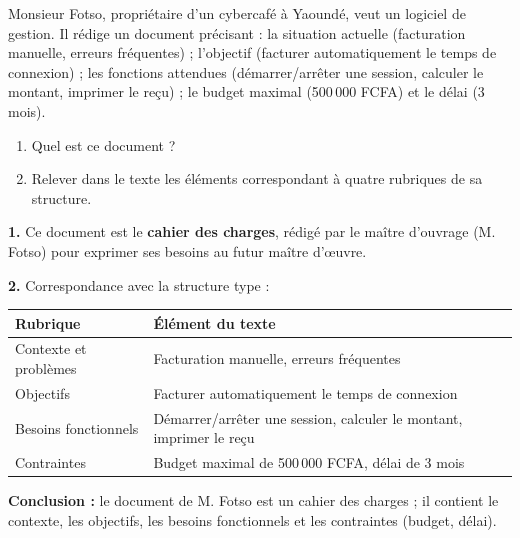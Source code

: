 \documentclass[11pt]{article}
\begin{document}
\begin{exoresolu}
Monsieur Fotso, propriétaire d'un cybercafé à Yaoundé, veut un logiciel de gestion. Il rédige un document précisant : la situation actuelle (facturation manuelle, erreurs fréquentes) ; l'objectif (facturer automatiquement le temps de connexion) ; les fonctions attendues (démarrer/arrêter une session, calculer le montant, imprimer le reçu) ; le budget maximal (500\,000 FCFA) et le délai (3 mois).
\begin{enumerate}
\item Quel est ce document ?
\item Relever dans le texte les éléments correspondant à quatre rubriques de sa structure.
\end{enumerate}
\tcblower
\textbf{1.} Ce document est le \textbf{cahier des charges}, rédigé par le maître d'ouvrage (M. Fotso) pour exprimer ses besoins au futur maître d'œuvre.

\textbf{2.} Correspondance avec la structure type :
\begin{center}
\begin{tabularx}{\linewidth}{|l|X|}
\hline
\rowcolor{popblueL} \textbf{Rubrique} & \textbf{Élément du texte} \\
\hline
Contexte et problèmes & Facturation manuelle, erreurs fréquentes \\
\hline
Objectifs & Facturer automatiquement le temps de connexion \\
\hline
Besoins fonctionnels & Démarrer/arrêter une session, calculer le montant, imprimer le reçu \\
\hline
Contraintes & Budget maximal de 500\,000 FCFA, délai de 3 mois \\
\hline
\end{tabularx}
\end{center}
\textbf{Conclusion :} le document de M. Fotso est un cahier des charges ; il contient le contexte, les objectifs, les besoins fonctionnels et les contraintes (budget, délai).
\end{exoresolu}
\end{document}
